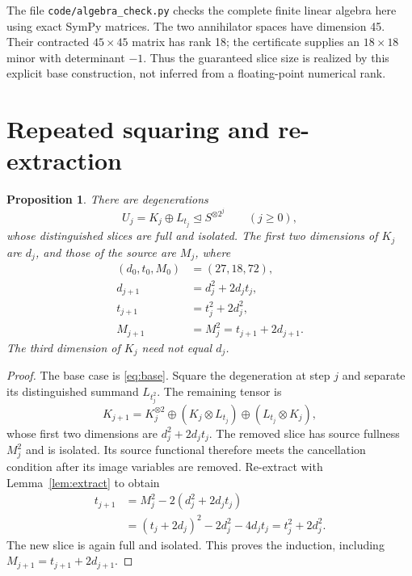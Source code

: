 \documentclass[11pt]{article}
\newcommand{\degto}{\trianglelefteq}
\newtheorem{proposition}[theorem]{Proposition}
\theoremstyle{definition}\newtheorem{definition}[theorem]{Definition}
\theoremstyle{remark}\newtheorem{remark}[theorem]{Remark}
\begin{document}
The file \texttt{code/algebra\_check.py} checks the complete finite linear
algebra here using exact SymPy matrices. The two annihilator spaces have
dimension 45. Their contracted $45\times45$ matrix has rank 18; the certificate
supplies an $18\times18$ minor with determinant $-1$. Thus the guaranteed slice
size is realized by this explicit base construction, not inferred from a
floating-point numerical rank.

\section{Repeated squaring and re-extraction}\label{sec:iteration}
\begin{proposition}\label{prop:recurrence}
There are degenerations
\[
U_j=K_j\oplus L_{t_j}\degto S^{\otimes2^j}\qquad(j\geq0),
\]
whose distinguished slices are full and isolated. The first two dimensions of
$K_j$ are $d_j$, and those of the source are $M_j$, where
\begin{align}\label{eq:dimensions}
(d_0,t_0,M_0)&=(27,18,72),\\
d_{j+1}&=d_j^2+2d_jt_j,\nonumber\\
t_{j+1}&=t_j^2+2d_j^2,\nonumber\\
M_{j+1}&=M_j^2=t_{j+1}+2d_{j+1}.\nonumber
\end{align}
The third dimension of $K_j$ need not equal $d_j$.
\end{proposition}
\begin{proof}
The base case is \eqref{eq:base}. Square the degeneration at step $j$ and
separate its distinguished summand $L_{t_j^2}$. The remaining tensor is
\[
K_{j+1}=K_j^{\otimes2}\oplus(K_j\otimes L_{t_j})
\oplus(L_{t_j}\otimes K_j),
\]
whose first two dimensions are $d_j^2+2d_jt_j$.
The removed slice has source fullness $M_j^2$ and is isolated. Its source
functional therefore meets the cancellation condition after its image
variables are removed. Re-extract with Lemma~\ref{lem:extract} to obtain
\begin{align*}
t_{j+1}&=M_j^2-2(d_j^2+2d_jt_j)\\
&=(t_j+2d_j)^2-2d_j^2-4d_jt_j=t_j^2+2d_j^2.
\end{align*}
The new slice is again full and isolated. This proves the induction, including
$M_{j+1}=t_{j+1}+2d_{j+1}$.
\end{proof}
\end{document}
